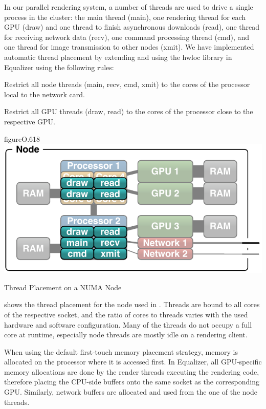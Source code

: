 In our parallel rendering system, a number of threads are used to drive a
single process in the cluster: the main thread (main), one rendering thread for
each GPU (draw) and one thread to finish asynchronous downloads (read), one
thread for receiving network data (recv), one command processing thread (cmd),
and one thread for image transmission to other nodes (xmit). We have
implemented automatic thread placement by extending and using the hwloc library
in Equalizer using the following rules:

\begin{compactitem}

\item Restrict all node threads (main, recv, cmd, xmit) to the cores of the
processor local to the network card.

\item Restrict all GPU threads (draw, read) to the cores of the processor close
to the respective GPU.

\end{compactitem}

\begin{wrapfloat}{figure}{O}{.618\textwidth}
 \includegraphics[width=.618\textwidth]{images/numaThreads.pdf}
 {\caption{\label{fNumaThreads}Thread Placement on a NUMA Node}}
\end{wrapfloat}

 shows the thread placement for the node used in
. Threads are bound to all cores of the respective socket, and
the ratio of cores to threads varies with the used hardware and software
configuration. Many of the threads do not occupy a full core at runtime,
especially node threads are mostly idle on a rendering client.

When using the default \textsf{first-touch} memory placement strategy, memory
is allocated on the processor where it is accessed first. In Equalizer, all
GPU-specific memory allocations are done by the render threads executing the
rendering code, therefore placing the CPU-side buffers onto the same socket as
the corresponding GPU. Similarly, network buffers are allocated and used from
the one of the node threads.

